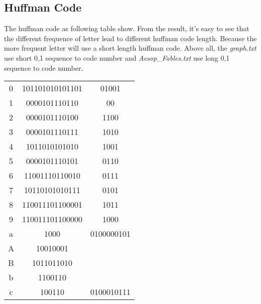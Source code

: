 \documentclass{article}
\numberwithin{equation}{section}
\begin{document}
\subsection{Huffman Code}
The huffman code as following table show. From the result, it's easy to see that the different frequence of letter lead to different huffman code length. Because the more frequent letter will use a short length huffman code. Above all, the \emph{graph.txt} use short 0,1 sequence to code number and \emph{Aesop\_Fables.txt} use long 0,1 sequence to code number.
            \begin{center}
            \tabletail{%
            \hline}
            \tablelasttail{\hline}
            \begin{supertabular}{ccc}
                    0  &  101101010101101 &  01001  \\
                    1  &  0000101110110 &   00      \\
                    2  &  0000101110100 &  1100     \\
                    3  &  0000101110111 &  1010     \\
                    4  &  1011010101010 &   1001    \\
                    5  &  0000101110101 &   0110    \\
                    6  &  11001110110010 &  0111    \\
                    7  &  10110101010111 &   0101   \\
                    8  &  110011101100001 & 1011    \\
                    9  &  110011101100000 & 1000    \\
                    a  &  1000 &       0100000101   \\
                    A  &  10010001 &                \\
                    B  &  1011011010 &              \\
                    b  &  1100110 &                 \\
                    c  &  100110 &    0100010111    \\

\end{supertabular}
\end{center}
\end{document}
